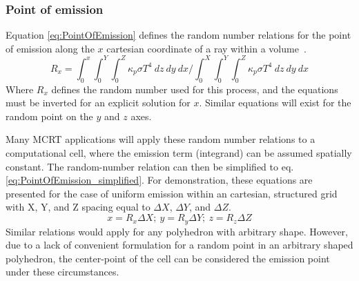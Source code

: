 \subsubsection{Point of emission}
Equation \ref{eq:PointOfEmission} defines the random number relations for the point of emission along the $x$ cartesian coordinate of a ray within a volume~\cite{Modest2013RadiativeTransferb}.
\begin{equation}
    R_x=\int^x_0{\int^Y_0{\int^Z_0{\kappa{}_p\sigma{}T^4~dz}~dy}~dx}\bigg/\int^X_0{\int^Y_0{\int^Z_0{\kappa{}_p\sigma{}T^4~dz}~dy}~dx}
    \label{eq:PointOfEmission}
\end{equation}
Where $R_x$ defines the random number used for this process, and the equations must be inverted for an explicit solution for $x$. Similar equations will exist for the random point on the $y$ and $z$ axes.

Many MCRT applications will apply these random number relations to a computational cell, where the emission term (integrand) can be assumed spatially constant. 
The random-number relation can then be simplified to eq. \ref{eq:PointOfEmission_simplified}. For demonstration, these equations are presented for the case of uniform emission within an cartesian, structured grid with X, Y, and Z spacing equal to $\Delta{}X$, $\Delta{}Y$, and $\Delta{}Z$. 
\begin{equation}
    x = R_x\Delta{X};~ y = R_y\Delta{Y};~z = R_z\Delta{Z}
    \label{eq:PointOfEmission_simplified}
\end{equation}
Similar relations would apply for any polyhedron with arbitrary shape. However, due to a lack of convenient formulation for a random point in an arbitrary shaped polyhedron, the center-point of the cell can be considered the emission point under these circumstances.

